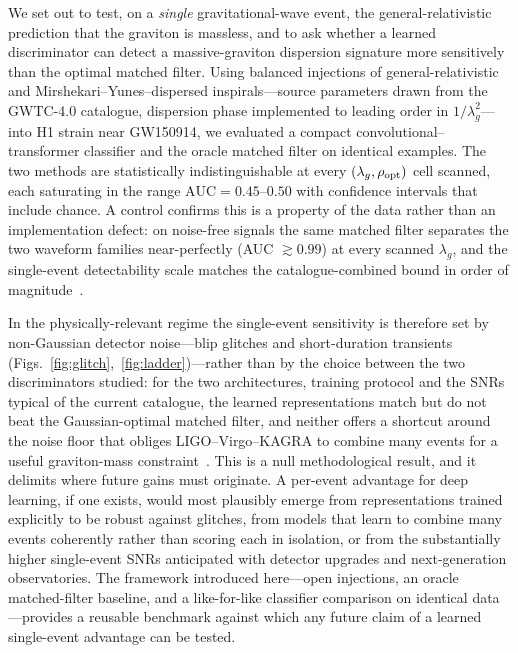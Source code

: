 \documentclass[11pt,a4paper]{article}
\newcommand{\lamg}{\lambda_{g}}
\begin{document}
We set out to test, on a \emph{single} gravitational-wave event, the
general-relativistic prediction that the graviton is massless, and to
ask whether a learned discriminator can detect a massive-graviton
dispersion signature more sensitively than the optimal matched filter.
Using balanced injections of general-relativistic and
Mirshekari--Yunes--dispersed inspirals---source parameters drawn from
the GWTC-4.0 catalogue, dispersion phase implemented to leading order
in $1/\lamg^{2}$---into H1 strain near GW150914, we evaluated a compact
convolutional--transformer classifier and the oracle matched filter on
identical examples. The two methods are statistically indistinguishable
at every $(\lamg,\rho_{\rm opt})$ cell scanned, each saturating in the
range $\mathrm{AUC}=0.45$--$0.50$ with confidence intervals that include
chance. A control confirms this is a property of the data rather than
an implementation defect: on noise-free signals the same matched filter
separates the two waveform families near-perfectly (AUC $\gtrsim 0.99$) at
every scanned $\lamg$, and the single-event detectability scale matches
the catalogue-combined bound in order of magnitude~\cite{TestGR_arXiv2112}.

In the physically-relevant regime the single-event sensitivity is
therefore set by non-Gaussian detector noise---blip glitches and
short-duration transients (Figs.~\ref{fig:glitch},~\ref{fig:ladder})---rather
than by the choice between the two discriminators studied: for the two
architectures, training protocol and the SNRs typical of the current
catalogue, the learned representations match but do not beat the
Gaussian-optimal matched filter, and neither offers a shortcut around the
noise floor that obliges LIGO--Virgo--KAGRA to combine many events for a
useful graviton-mass constraint~\cite{TestGR_arXiv2112}. This is a null methodological
result, and it delimits where future gains must originate. A per-event
advantage for deep learning, if one exists, would most plausibly emerge
from representations trained explicitly to be robust against glitches,
from models that learn to combine many events coherently rather than
scoring each in isolation, or from the substantially higher
single-event SNRs anticipated with detector upgrades and
next-generation observatories. The framework introduced here---open
injections, an oracle matched-filter baseline, and a like-for-like
classifier comparison on identical data---provides a reusable benchmark
against which any future claim of a learned single-event advantage can
be tested.
\end{document}
